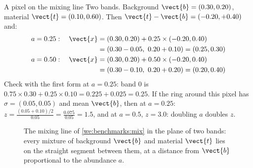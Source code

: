 \begin{worked}[label={we:benchmarks:mix}]{A pixel on the mixing line}
Two bands. Background $\vect{b} = (0.30, 0.20)$, material $\vect{t} = (0.10, 0.60)$\tagA{}. Then
$\vect{t} - \vect{b} = (-0.20, +0.40)$ and:
\begin{align*}
a = 0.25: \quad \vect{x} &= (0.30, 0.20) + 0.25 \times (-0.20, 0.40)\\
&= (0.30 - 0.05,\ 0.20 + 0.10) = (0.25, 0.30)\\
a = 0.50: \quad \vect{x} &= (0.30, 0.20) + 0.50 \times (-0.20, 0.40)\\
&= (0.30 - 0.10,\ 0.20 + 0.20) = (0.20, 0.40)
\end{align*}
Check with the first form at $a = 0.25$: band 0 is $0.75 \times 0.30 + 0.25 \times 0.10 = 0.225 + 0.025 = 0.25$. If
the ring around this pixel has $\sigma = (0.05, 0.05)$ and mean $\vect{b}$, then at $a = 0.25$:
$z = \frac{(0.05 + 0.10)/2}{0.05} = \frac{0.075}{0.05} = 1.5$, and at $a = 0.5$, $z = 3.0$: doubling $a$ doubles $z$.
\end{worked}

\begin{figure}[htbp]
\centering
{}
\caption{The mixing line of \cref{we:benchmarks:mix} in the plane of two bands: every mixture of background
$\vect{b}$ and material $\vect{t}$ lies on the straight segment between them, at a distance from $\vect{b}$
proportional to the abundance $a$.}
\label{fig:benchmarks:mixline}
\end{figure}


